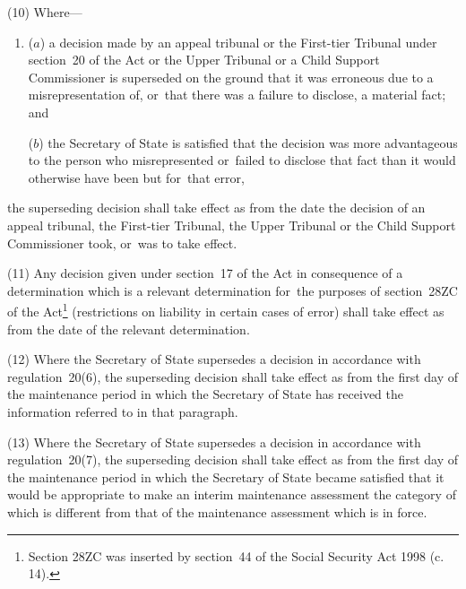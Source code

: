 \documentclass[a4paper,12pt]{article}
\begin{document}
(10) Where---
\begin{enumerate}\item[]
($a$) a decision made by 
an appeal tribunal or the First-tier Tribunal under section~20 of the Act or the Upper Tribunal or a Child Support Commissioner  %
is superseded on the ground that it was erroneous due to a misrepresentation of, or~that there was a failure to disclose, a material fact; and

($b$) the Secretary of State is satisfied that the decision was more advantageous to the person who misrepresented or~failed to disclose that fact than it would otherwise have been but for~that error,
\end{enumerate}
the superseding decision shall take effect as from the date the decision of 
an appeal tribunal, the First-tier Tribunal, the Upper Tribunal or the Child Support Commissioner  %
took, or~was to take effect.

(11) Any decision given under section~17 of the Act in consequence of a determination which is a relevant determination for~the purposes of section~28ZC of the Act\footnote{\frenchspacing Section 28ZC was inserted by section~44 of the Social Security Act 1998 (c. 14).} (restrictions on liability in certain cases of error) shall take effect as from the date of the relevant determination.

(12) Where the Secretary of State supersedes a decision in accordance with regulation~20(6), the superseding decision shall take effect as from the first day of the maintenance period in which the Secretary of State has received the information referred to in that paragraph.

(13) Where the Secretary of State supersedes a decision in accordance with regulation~20(7), the superseding decision shall take effect as from the first day of the maintenance period in which the Secretary of State became satisfied that it would be appropriate to make an interim maintenance assessment the category of which is different from that of the maintenance assessment which is in force.
\end{document}
